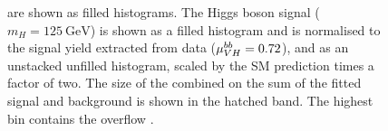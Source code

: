\begin{figure}[!htbp]
{    are shown as filled histograms. The Higgs boson signal ($m_H =
    \SI{125}{\GeV}$) is shown as a filled histogram and is 
    normalised to the signal yield extracted from data
    ($\mu_{VH}^{bb} = 0.72$), and as an unstacked unfilled histogram,
    scaled by the SM prediction times a factor of two. The size of the
    combined on the sum of the
    fitted signal and background is shown in the hatched band. The
    highest bin contains the overflow \cite{HIGG-2018-52}. 
  }
  \label{fig:vhbb_postfit_plots}
\end{figure}


